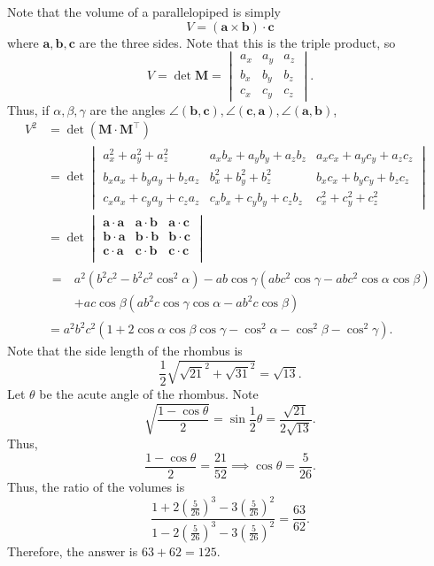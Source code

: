 \begin{solution}[name={Solution by naman12}]
	Note that the volume of a parallelopiped is simply
	\[V=(\mathbf a\times\mathbf b)\cdot\mathbf c\]where $\mathbf a,\mathbf b,\mathbf c$ are the three sides. Note that this is the triple product, so
	\[V=\det\mathbf M=\begin{vmatrix}a_x&a_y&a_z\\b_x&b_y&b_z\\c_x&c_y&c_z\end{vmatrix}.\]
	Thus, if $\alpha,\beta,\gamma$ are the angles $\angle(\mathbf b,\mathbf c),\angle(\mathbf c,\mathbf a),\angle(\mathbf a,\mathbf b)$,
	\[\begin{aligned}
		V^2&=\det(\mathbf M\cdot\mathbf M^\intercal)\\
		&=\det\begin{vmatrix}
			a_x^2+a_y^2+a_z^2&a_xb_x+a_yb_y+a_zb_z&a_xc_x+a_yc_y+a_zc_z\\
			b_xa_x+b_ya_y+b_za_z&b_x^2+b_y^2+b_z^2&b_xc_x+b_yc_y+b_zc_z\\
			c_xa_x+c_ya_y+c_za_z&c_xb_x+c_yb_y+c_zb_z&c_x^2+c_y^2+c_z^2
		\end{vmatrix}\\
		&=\det\begin{vmatrix}
			\mathbf a\cdot\mathbf a&\mathbf a\cdot\mathbf b&\mathbf a\cdot\mathbf c\\
			\mathbf b\cdot\mathbf a&\mathbf b\cdot\mathbf b&\mathbf b\cdot\mathbf c\\
			\mathbf c\cdot\mathbf a&\mathbf c\cdot\mathbf b&\mathbf c\cdot\mathbf c\\
		\end{vmatrix}\\
		&
		\begin{aligned}
			{}=~&a^2(b^2c^2-b^2c^2\cos^2\alpha)-ab\cos\gamma(abc^2\cos\gamma-abc^2\cos\alpha\cos\beta)\\
			&+ac\cos\beta(ab^2c\cos\gamma\cos\alpha-ab^2c\cos\beta)
		\end{aligned}\\
		&=a^2b^2c^2(1+2\cos\alpha\cos\beta\cos\gamma-\cos^2\alpha-\cos^2\beta-\cos^2\gamma).
	\end{aligned}\]Note that the side length of the rhombus is
	\[\frac 12\sqrt{\sqrt{21}^2+\sqrt{31}^2}=\sqrt{13}.\]Let $\theta$ be the acute angle of the rhombus. Note
	\[\sqrt{\frac{1-\cos\theta}2}=\sin\frac12\theta=\frac{\sqrt{21}}{2\sqrt{13}}.\]Thus,
	\[\frac{1-\cos\theta}2=\frac{21}{52}\implies\cos\theta=\frac{5}{26}.\]Thus, the ratio of the volumes is
	\[\frac{1+2(\frac 5{26})^3-3(\frac 5{26})^2}{1-2(\frac 5{26})^3-3(\frac 5{26})^2}=\frac{63}{62}.\]Therefore, the answer is $63+62=\boxed{125}$.
\end{solution}








